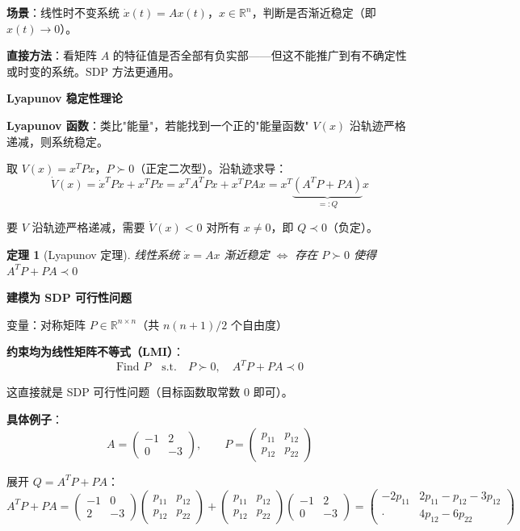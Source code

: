\documentclass[12pt, a4paper]{ctexart}
\newtheorem{theorem}{定理}[section]
\begin{document}
\begin{blackboard}

\textbf{场景}：线性时不变系统 $\dot{x}(t) = Ax(t)$，$x \in \mathbb{R}^n$，判断是否渐近稳定（即 $x(t) \to 0$）。

\textbf{直接方法}：看矩阵 $A$ 的特征值是否全部有负实部——但这不能推广到有不确定性或时变的系统。SDP 方法更通用。

\textbf{Lyapunov 稳定性理论}

\textbf{Lyapunov 函数}：类比"能量"，若能找到一个正的"能量函数" $V(x)$ 沿轨迹严格递减，则系统稳定。

取 $V(x) = x^T P x$，$P \succ 0$（正定二次型）。沿轨迹求导：
\[
\dot{V}(x) = \dot{x}^T P x + x^T P \dot{x}
= x^T A^T P x + x^T P A x
= x^T \underbrace{(A^T P + PA)}_{=:Q} x
\]

要 $V$ 沿轨迹严格递减，需要 $\dot{V}(x) < 0$ 对所有 $x\neq 0$，即 $Q \prec 0$（负定）。

\begin{theorem}[Lyapunov 定理]
线性系统 $\dot{x}=Ax$ 渐近稳定 $\Longleftrightarrow$ 存在 $P \succ 0$ 使得 $A^TP + PA \prec 0$
\end{theorem}

\textbf{建模为 SDP 可行性问题}

变量：对称矩阵 $P \in \mathbb{R}^{n\times n}$（共 $n(n+1)/2$ 个自由度）

\textbf{约束均为线性矩阵不等式（LMI）}：
\[
\text{Find } P \quad \text{s.t.} \quad P \succ 0, \quad A^TP + PA \prec 0
\]

这直接就是 SDP 可行性问题（目标函数取常数 0 即可）。

\textbf{具体例子}：
\[
A = \begin{pmatrix} -1 & 2 \\ 0 & -3 \end{pmatrix}, \qquad
P = \begin{pmatrix} p_{11} & p_{12} \\ p_{12} & p_{22} \end{pmatrix}
\]

展开 $Q = A^TP + PA$：
\[
A^TP + PA
= \begin{pmatrix} -1 & 0 \\ 2 & -3 \end{pmatrix}\begin{pmatrix} p_{11} & p_{12} \\ p_{12} & p_{22} \end{pmatrix}
+ \begin{pmatrix} p_{11} & p_{12} \\ p_{12} & p_{22} \end{pmatrix}\begin{pmatrix} -1 & 2 \\ 0 & -3 \end{pmatrix}
= \begin{pmatrix} -2p_{11} & 2p_{11} - p_{12} - 3p_{12} \\ \cdot & 4p_{12} - 6p_{22} \end{pmatrix}
\]


\end{blackboard}
\end{document}
